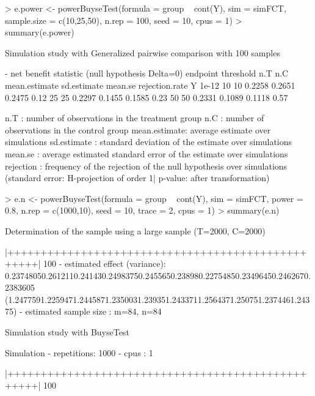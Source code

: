 \documentclass[12pt]{article}
\theoremstyle{definition}
\begin{document}
\begin{Rcode}
> e.power <- powerBuyseTest(formula = group ~ cont(Y),
                           sim = simFCT, sample.size = c(10,25,50),
                           n.rep = 100, seed = 10, cpus = 1)
> summary(e.power)
\end{Rcode}

\begin{Routput}
         Simulation study with Generalized pairwise comparison
with 100 samples

- net benefit statistic (null hypothesis Delta=0)
endpoint threshold n.T n.C mean.estimate sd.estimate mean.se rejection.rate
       Y     1e-12  10  10        0.2258      0.2651  0.2475           0.12
                    25  25        0.2297      0.1455  0.1585           0.23
                    50  50        0.2331      0.1089  0.1118           0.57

n.T          : number of observations in the treatment group
n.C          : number of observations in the control group
mean.estimate: average estimate over simulations
sd.estimate  : standard deviation of the estimate over simulations
mean.se      : average estimated standard error of the estimate over simulations
rejection    : frequency of the rejection of the null hypothesis over simulations
(standard error: H-projection of order 1| p-value: after transformation) 
\end{Routput}


\begin{Rcode}
> e.n <- powerBuyseTest(formula = group ~ cont(Y),
                        sim = simFCT, power = 0.8,
                        n.rep = c(1000,10), seed = 10, trace = 2, cpus = 1)
> summary(e.n)
\end{Rcode}

\begin{Routput}
	Determination of the sample using a large sample (T=2000, C=2000)  

|++++++++++++++++++++++++++++++++++++++++++++++++++| 100%
- estimated effect (variance): 0.23748050.2612110.241430.24983750.2455650.238980.22754850.23496450.2462670.2383605 (1.2477591.2259471.2445871.2350031.239351.2433711.2564371.250751.2374461.24375)
- estimated sample size      : m=84, n=84

Simulation study with BuyseTest 

Simulation
- repetitions: 1000
- cpus       : 1

|++++++++++++++++++++++++++++++++++++++++++++++++++| 100%
\end{Routput}
\end{document}
